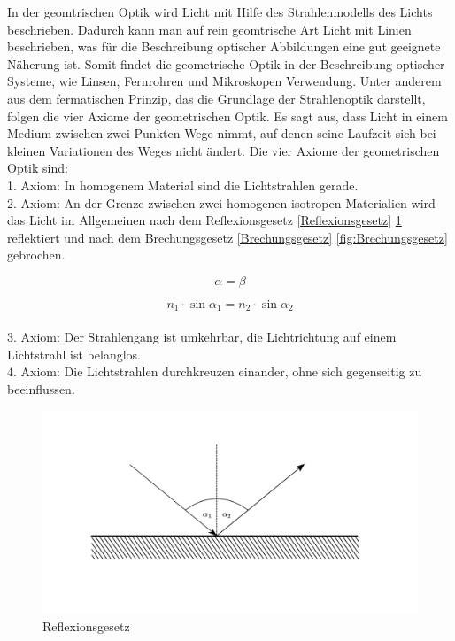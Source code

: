 In der geomtrischen Optik wird Licht mit Hilfe des Strahlenmodells des Lichts beschrieben. Dadurch kann man auf rein geomtrische Art Licht mit Linien beschrieben, was für die Beschreibung optischer Abbildungen eine gut geeignete Näherung ist. Somit findet die geometrische Optik in der Beschreibung optischer Systeme, wie Linsen, Fernrohren und Mikroskopen Verwendung. Unter anderem aus dem fermatischen Prinzip, das die Grundlage der Strahlenoptik darstellt, folgen die vier Axiome der geometrischen Optik. Es sagt aus, dass Licht in einem Medium zwischen zwei Punkten Wege nimmt, auf denen seine Laufzeit sich bei kleinen Variationen des Weges nicht ändert. Die vier Axiome der geometrischen Optik sind: \\
    1. Axiom: In homogenem Material sind die Lichtstrahlen gerade. \\
    2. Axiom: An der Grenze zwischen zwei homogenen isotropen Materialien wird das Licht im Allgemeinen nach dem Reflexionsgesetz \ref{Reflexionsgesetz} \ref{fig:Reflexionsgesetz} reflektiert und nach dem Brechungsgesetz \ref{Brechungsgesetz} \ref{fig:Brechungsgesetz} gebrochen. 
    
    \begin{equation} \label{Reflexionsgesetz}
        \alpha = \beta
    \end{equation}
    
    \begin{equation} \label{Brechungsgesetz}
        n_1 \cdot \sin{\alpha_1} = n_2 \cdot \sin{\alpha_2}
    \end{equation}
    \\
    3. Axiom: Der Strahlengang ist umkehrbar, die Lichtrichtung auf einem Lichtstrahl ist belanglos. \\
    4. Axiom: Die Lichtstrahlen durchkreuzen einander, ohne sich gegenseitig zu beeinflussen. \\
    
    \begin{figure}
        \centering
        \includegraphics{Geometrische_Optik/Protokoll/fig/Reflexionsgesetz.png}
        \caption{Reflexionsgesetz}
        \label{fig:Reflexionsgesetz}
    \end{figure}
    
